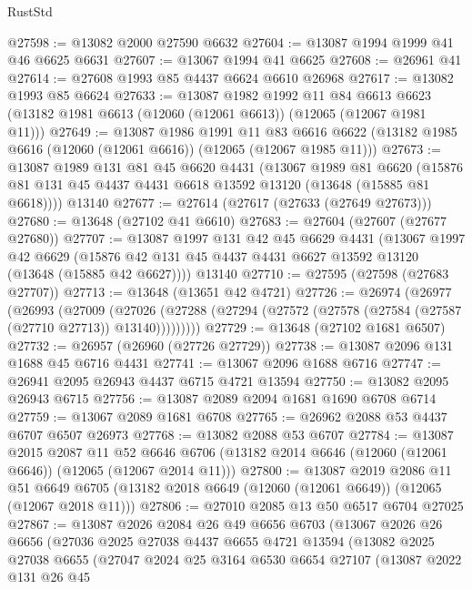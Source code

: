 \begin{lexlean}{RustStd}
\begin{coremodule}
@27598 := @13082 @2000 @27590 @6632
@27604 := @13087 @1994 @1999 @41 @46 @6625 @6631
@27607 := @13067 @1994 @41 @6625
@27608 := @26961 @41
@27614 := @27608 @1993 @85 @4437 @6624 @6610 @26968
@27617 := @13082 @1993 @85 @6624
@27633 := @13087
    @1982
    @1992
    @11
    @84
    @6613
    @6623
    (@13182 @1981 @6613 (@12060 (@12061 @6613)) (@12065 (@12067 @1981 @11)))
@27649 := @13087
    @1986
    @1991
    @11
    @83
    @6616
    @6622
    (@13182 @1985 @6616 (@12060 (@12061 @6616)) (@12065 (@12067 @1985 @11)))
@27673 := @13087
    @1989
    @131
    @81
    @45
    @6620
    @4431
    (@13067
      @1989
      @81
      @6620
      (@15876 @81 @131 @45 @4437 @4431 @6618 @13592 @13120 (@13648 (@15885 @81 @6618))))
    @13140
@27677 := @27614 (@27617 (@27633 (@27649 @27673)))
@27680 := @13648 (@27102 @41 @6610)
@27683 := @27604 (@27607 (@27677 @27680))
@27707 := @13087
    @1997
    @131
    @42
    @45
    @6629
    @4431
    (@13067
      @1997
      @42
      @6629
      (@15876 @42 @131 @45 @4437 @4431 @6627 @13592 @13120 (@13648 (@15885 @42 @6627))))
    @13140
@27710 := @27595 (@27598 (@27683 @27707))
@27713 := @13648 (@13651 @42 @4721)
@27726 := @26974
    (@26977
      (@26993
        (@27009
          (@27026 (@27288 (@27294 (@27572 (@27578 (@27584 (@27587 (@27710 @27713)) @13140)))))))))
@27729 := @13648 (@27102 @1681 @6507)
@27732 := @26957 (@26960 (@27726 @27729))
@27738 := @13087 @2096 @131 @1688 @45 @6716 @4431
@27741 := @13067 @2096 @1688 @6716
@27747 := @26941 @2095 @26943 @4437 @6715 @4721 @13594
@27750 := @13082 @2095 @26943 @6715
@27756 := @13087 @2089 @2094 @1681 @1690 @6708 @6714
@27759 := @13067 @2089 @1681 @6708
@27765 := @26962 @2088 @53 @4437 @6707 @6507 @26973
@27768 := @13082 @2088 @53 @6707
@27784 := @13087
    @2015
    @2087
    @11
    @52
    @6646
    @6706
    (@13182 @2014 @6646 (@12060 (@12061 @6646)) (@12065 (@12067 @2014 @11)))
@27800 := @13087
    @2019
    @2086
    @11
    @51
    @6649
    @6705
    (@13182 @2018 @6649 (@12060 (@12061 @6649)) (@12065 (@12067 @2018 @11)))
@27806 := @27010 @2085 @13 @50 @6517 @6704 @27025
@27867 := @13087
    @2026
    @2084
    @26
    @49
    @6656
    @6703
    (@13067
      @2026
      @26
      @6656
      (@27036
        @2025
        @27038
        @4437
        @6655
        @4721
        @13594
        (@13082
          @2025
          @27038
          @6655
          (@27047
            @2024
            @25
            @3164
            @6530
            @6654
            @27107
            (@13087
              @2022
              @131
              @26
              @45

\end{coremodule}
\end{lexlean}
